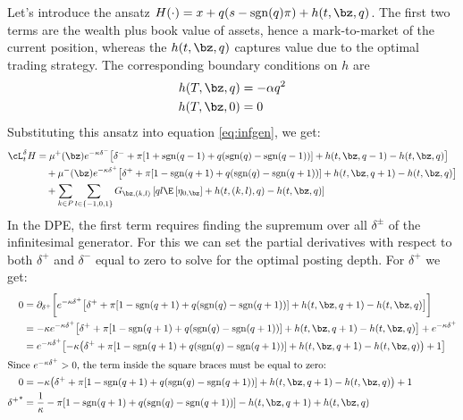 \documentclass[12pt]{article}
\begin{document}
Let's introduce the ansatz $H(\cdot) = x + q(s - \mathrm{sgn}(q)\pi) + h(t,\bz,q)$. The first two terms are the wealth plus book value of assets, hence a mark-to-market of the current position, whereas the $h(t,\bz,q)$ captures value due to the optimal trading strategy. The corresponding boundary conditions on $h$ are
\begin{align}
h(T, \bz, q) & = - \alpha q^2 \\
h(T, \bz, 0) & = 0
\end{align}
Substituting this ansatz into equation \ref{eq:infgen}, we get:
\begin{align*}
\cL^{\delta}_t H & = \mu^+(\bz) e^{ -\kappa \delta^{-}} \bigl[ \delta^- + \pi [ 1 + \mathrm{sgn}(q-1) + q(\mathrm{sgn}(q) - \mathrm{sgn}(q-1) ) ] + h(t,\bz,q-1) - h(t,\bz,q) \bigr] \\
& \quad + \mu^-(\bz) e^{ -\kappa \delta^{+}} \bigl[ \delta^+ + \pi [ 1 - \mathrm{sgn}(q+1) + q(\mathrm{sgn}(q) - \mathrm{sgn}(q+1) ) ] + h(t,\bz,q+1) - h(t,\bz,q) \bigr] \\
& \quad + \sum_{k\in P} \sum_{l \in \{-1,0,1\}} G_{\bz,(k,l)} \left[ ql \E \left[ \eta_{0,\bz} \right] + h(t,(k,l),q) - h(t,\bz,q) \right] 
\end{align*}
In the DPE, the first term requires finding the supremum over all $\delta^\pm$ of the infinitesimal generator. For this we can set the partial derivatives with respect to both $\delta^+$ and $\delta^-$ equal to zero to solve for the optimal posting depth. For $\delta^+$ we get:
\begin{align*}
0 & = \partial_{\delta^+} \biggl[ e^{ -\kappa \delta^{+}} \bigl[ \delta^+ + \pi [ 1 - \mathrm{sgn}(q+1) + q(\mathrm{sgn}(q) - \mathrm{sgn}(q+1) ) ] + h(t,\bz,q+1) - h(t,\bz,q) \bigr] \biggr] \\
& = -\kappa e^{ -\kappa \delta^{+}} \bigl[ \delta^+ + \pi [ 1 - \mathrm{sgn}(q+1) + q(\mathrm{sgn}(q) - \mathrm{sgn}(q+1) ) ] + h(t,\bz,q+1) - h(t,\bz,q) \bigr] + e^{ -\kappa \delta^{+}} \\
& = e^{ -\kappa \delta^{+}} \bigl[ -\kappa \bigl( \delta^+ + \pi [ 1 - \mathrm{sgn}(q+1) + q(\mathrm{sgn}(q) - \mathrm{sgn}(q+1) ) ] + h(t,\bz,q+1) - h(t,\bz,q) \bigr) + 1 \bigr] \\
\intertext{Since $e^{ -\kappa \delta^{+}}>0$, the term inside the square braces must be equal to zero:}
0 & = -\kappa \bigl( \delta^+ + \pi [ 1 - \mathrm{sgn}(q+1) + q(\mathrm{sgn}(q) - \mathrm{sgn}(q+1) ) ] + h(t,\bz,q+1) - h(t,\bz,q) \bigr) + 1 \\
{\delta^+}^* & = \frac{1}{\kappa} - \pi [ 1 - \mathrm{sgn}(q+1) + q(\mathrm{sgn}(q) - \mathrm{sgn}(q+1) ) ] - h(t,\bz,q+1) + h(t,\bz,q) 
\end{align*}
\end{document}
